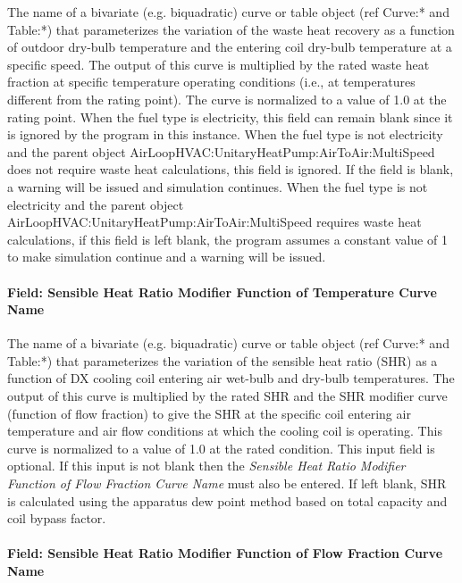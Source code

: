The name of a bivariate (e.g. biquadratic) curve or table object (ref Curve:* and Table:*) that parameterizes the variation of the waste heat recovery as a function of outdoor dry-bulb temperature and the entering coil dry-bulb temperature at a specific speed. The output of this curve is multiplied by the rated waste heat fraction at specific temperature operating conditions (i.e., at temperatures different from the rating point). The curve is normalized to a value of 1.0 at the rating point. When the fuel type is electricity, this field can remain blank since it is ignored by the program in this instance. When the fuel type is not electricity and the parent object AirLoopHVAC:UnitaryHeatPump:AirToAir:MultiSpeed does not require waste heat calculations, this field is ignored. If the field is blank, a warning will be issued and simulation continues. When the fuel type is not electricity and the parent object AirLoopHVAC:UnitaryHeatPump:AirToAir:MultiSpeed requires waste heat calculations, if this field is left blank, the program assumes a constant value of 1 to make simulation continue and a warning will be issued.

\paragraph{Field: Sensible Heat Ratio Modifier Function of Temperature Curve Name}\label{field-sensible-heat-ratio-modifier-function-of-temperature-curve-name}

The name of a bivariate (e.g. biquadratic) curve or table object (ref Curve:* and Table:*) that parameterizes the variation of the sensible heat ratio (SHR) as a function of DX cooling coil entering air wet-bulb and dry-bulb temperatures. The output of this curve is multiplied by the rated SHR and the SHR modifier curve (function of flow fraction) to give the SHR at the specific coil entering air temperature and air flow conditions at which the cooling coil is operating. This curve is normalized to a value of 1.0 at the rated condition. This input field is optional. If this input is not blank then the \textit{Sensible Heat Ratio Modifier Function of Flow Fraction Curve Name} must also be entered. If left blank, SHR is calculated using the apparatus dew point method based on total capacity and coil bypass factor.

\paragraph{Field: Sensible Heat Ratio Modifier Function of Flow Fraction Curve Name}\label{field-sensible-heat-ratio-modifier-function-of-flow-fraction-curve-name}

